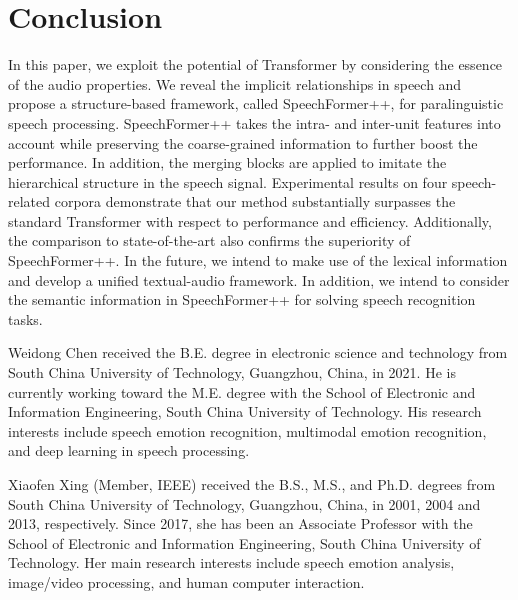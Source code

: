 \documentclass[lettersize,journal]{IEEEtran}
\begin{document}
\section{Conclusion}
In this paper, we  exploit the potential of Transformer by considering the essence of the audio properties. We reveal the implicit relationships in speech and propose a structure-based framework, called SpeechFormer++, for paralinguistic speech processing. SpeechFormer++ takes the intra- and inter-unit features into account while preserving the coarse-grained information to further boost the performance. In addition, the merging blocks are applied to imitate the hierarchical structure in the speech signal. Experimental results on four speech-related corpora demonstrate that our method substantially surpasses the standard Transformer with respect to performance and efficiency. Additionally, the comparison to state-of-the-art also confirms the superiority of SpeechFormer++. In the future, we intend to make use of the lexical information and develop a unified textual-audio framework. In addition, we intend to consider the semantic information in SpeechFormer++ for solving speech recognition tasks.







\vspace{11pt}
\vspace{-33pt}
\begin{IEEEbiography}{Weidong Chen} received the B.E. degree in electronic science and technology from South China University of Technology, Guangzhou, China, in 2021. He is currently working toward the M.E. degree with the School of Electronic and Information Engineering, South China University of Technology. His research interests include speech emotion recognition, multimodal emotion recognition, and deep learning in speech processing.
\end{IEEEbiography}

\vspace{11pt}
\vspace{-33pt}
\begin{IEEEbiography}{Xiaofen Xing} (Member, IEEE) received the B.S., M.S., and Ph.D. degrees from South China University of Technology, Guangzhou, China, in 2001, 2004 and 2013, respectively. Since 2017, she has been an Associate Professor with the School of Electronic and Information Engineering, South China University of Technology. Her main research interests include speech emotion analysis, image/video processing, and human computer interaction.
\end{IEEEbiography}
\end{document}
